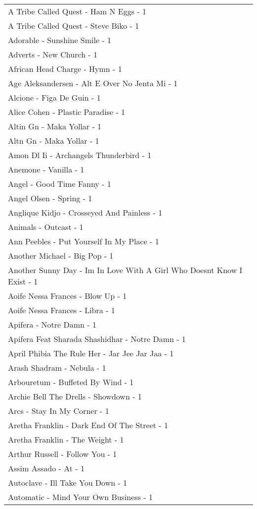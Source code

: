 \documentclass[
]{article}
\begin{document}
\begin{longtable}{l}
A Tribe Called Quest - Ham N Eggs - 1 \\ 
A Tribe Called Quest - Steve Biko - 1 \\ 
Adorable - Sunshine Smile - 1 \\ 
Adverts - New Church - 1 \\ 
African Head Charge - Hymn - 1 \\ 
Age Aleksandersen - Alt E Over No Jenta Mi - 1 \\ 
Alcione - Figa De Guin - 1 \\ 
Alice Cohen - Plastic Paradise - 1 \\ 
Altin Gn - Maka Yollar - 1 \\ 
Altn Gn - Maka Yollar - 1 \\ 
Amon Dl Ii - Archangels Thunderbird - 1 \\ 
Anemone - Vanilla - 1 \\ 
Angel - Good Time Fanny - 1 \\ 
Angel Olsen - Spring - 1 \\ 
Anglique Kidjo - Crosseyed And Painless - 1 \\ 
Animals - Outcast - 1 \\ 
Ann Peebles - Put Yourself In My Place - 1 \\ 
Another Michael - Big Pop - 1 \\ 
Another Sunny Day - Im In Love With A Girl Who Doesnt Know I Exist - 1 \\ 
Aoife Nessa Frances - Blow Up - 1 \\ 
Aoife Nessa Frances - Libra - 1 \\ 
Apifera - Notre Damn - 1 \\ 
Apifera Feat Sharada Shashidhar - Notre Damn - 1 \\ 
April Phibia The Rule Her - Jar Jee Jar Jaa - 1 \\ 
Arash Shadram - Nebula - 1 \\ 
Arbouretum - Buffeted By Wind - 1 \\ 
Archie Bell The Drells - Showdown - 1 \\ 
Arcs - Stay In My Corner - 1 \\ 
Aretha Franklin - Dark End Of The Street - 1 \\ 
Aretha Franklin - The Weight - 1 \\ 
Arthur Russell - Follow You - 1 \\ 
Assim Assado - At - 1 \\ 
Autoclave - Ill Take You Down - 1 \\ 
Automatic - Mind Your Own Business - 1 \\ 

\end{longtable}
\end{document}
